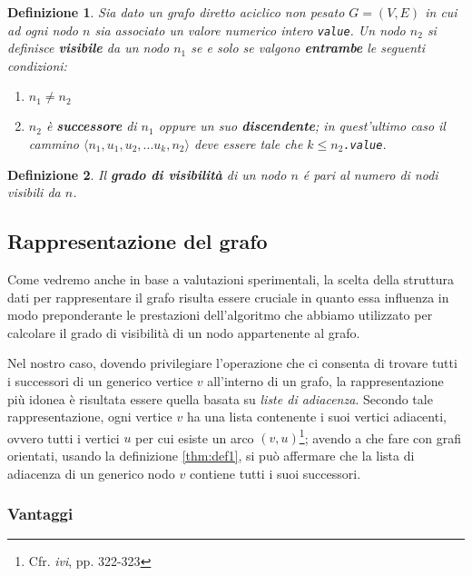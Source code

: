 \documentclass[10pt,a4paper,titlepage]{article}
\newtheorem{thm}{Definizione}
\begin{document}
\begin{thm}\label{thm:def4}
Sia dato un grafo diretto aciclico non pesato $G = (V, E)$ in cui ad ogni nodo $n$ sia associato un valore numerico intero \texttt{value}. 
Un nodo $n_2$ si definisce \textbf{visibile} da un nodo $n_1$ se e solo se valgono \textbf{entrambe} le seguenti condizioni:
\begin{enumerate}
\item $n_1 \neq n_2$
\item $n_2$ è \textbf{successore} di $n_1$ oppure un suo \textbf{discendente}; in quest'ultimo caso il cammino $\langle n_1, u_1, u_2, ...u_k, n_2 \rangle$ deve essere tale che $k \leq n_2$\texttt{.value}.
\end{enumerate}

\end{thm}

\begin{thm}\label{thm:def5}
Il \textbf{grado di visibilità} di un nodo $n$ é pari al numero di nodi visibili da $n$.
\end{thm}


\subsection{Rappresentazione del grafo}

Come vedremo anche in base a valutazioni sperimentali, la scelta della struttura dati per rappresentare il grafo risulta essere cruciale in quanto essa influenza in modo preponderante le prestazioni dell'algoritmo che abbiamo utilizzato per calcolare il grado di visibilità di un nodo appartenente al grafo. 

Nel nostro caso, dovendo privilegiare l'operazione che ci consenta di trovare tutti i successori di un generico vertice $v$ all'interno di un grafo, la rappresentazione più idonea è risultata essere quella basata su \textit{liste di adiacenza}. Secondo tale rappresentazione, ogni vertice $v$ ha una lista contenente i suoi vertici adiacenti, ovvero tutti i vertici $u$ per cui esiste un arco $(v, u)$\footnote{Cfr. \textit{ivi}, pp. 322-323}; avendo a che fare con grafi orientati, usando la definizione \ref{thm:def1}, si può affermare che la lista di adiacenza di un generico nodo $v$ contiene tutti i suoi successori.

\subsubsection{Vantaggi}
\end{document}
